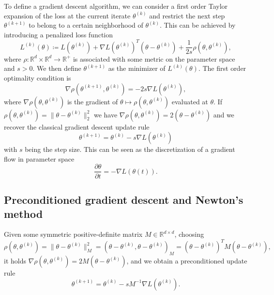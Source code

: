 \documentclass{article}
\theoremstyle{noparens}
\newcommand{\R}{\mathbb{R}}
\newcommand{\metric}{\rho}
\newcommand{\paramk}{\theta^{(k)}}
\newcommand{\paramkp}{\theta^{(k+1)}}
\newcommand{\GradP}{\nabla}
\newcommand{\LossGrad}{\GradP L}
\begin{document}
To define a gradient descent algorithm, we can consider a first order Taylor expansion of the loss at the current iterate  $\paramk $ and restrict the next step $\paramkp$ to belong to a certain neighborhood of $\paramk$. This can be achieved by introducing a penalized loss function
\begin{equation}
	  L^{(k)}(\theta) \coloneqq L(\paramk) + \LossGrad(\paramk)^T (\theta-\paramk) + \frac{1}{2s} \metric(\theta, \paramk),
	  \label{eq:taylor_gd}
\end{equation}
where $\metric: \mathbb{R}^d\times\mathbb{R}^d\to \R^+$  is associated with some metric on the parameter space and $s>0$. We then define $\paramkp$ as the minimizer of  $L^{(k)}(\theta)$. The first order optimality condition is
\begin{equation}
	  \GradP \metric(\paramkp, \paramk) = -2s \LossGrad(\paramk),
	  \label{eq:gdrule}
\end{equation}
where $\GradP \metric(\theta , \paramk) $ is the gradient of $\theta\mapsto \metric(\theta , \paramk)$ evaluated at $\theta$.
If $\metric(\theta, \paramk) = \|\theta -\paramk\|^2_{2}$ we have   $\GradP \metric(\theta, \paramk)=2(\theta-\paramk)$ and we recover the classical gradient descent update rule
\begin{equation}
\paramkp=\paramk -s \LossGrad(\paramk)
\label{eq:GD}
\end{equation}
with $s$ being the step size. This can be seen as the discretization of a gradient flow in parameter space
\begin{equation}
\frac{\partial \theta}{\partial t} = - \nabla L(\theta(t)).\label{eq:gradient-flow}
\end{equation}


\subsection{Preconditioned gradient descent and Newton's method}

Given some symmetric positive-definite matrix $M\in\R^{d\times d}$, choosing
\begin{equation}
	  \metric(\theta, \paramk) = \|\theta-\paramk\|^2_{M} = ( \theta-\paramk, \theta-\paramk )_M = (\theta-\paramk)^TM(\theta-\paramk),
	  \label{eq:precondgrad}
\end{equation}
it holds $\GradP \metric(\theta, \paramk)=2M(\theta-\paramk)$, and we obtain
a preconditioned update rule
\begin{equation}
	  \paramkp = \paramk-s M^{-1} \LossGrad(\paramk).
	  \label{eq:precond}
\end{equation}
\end{document}
